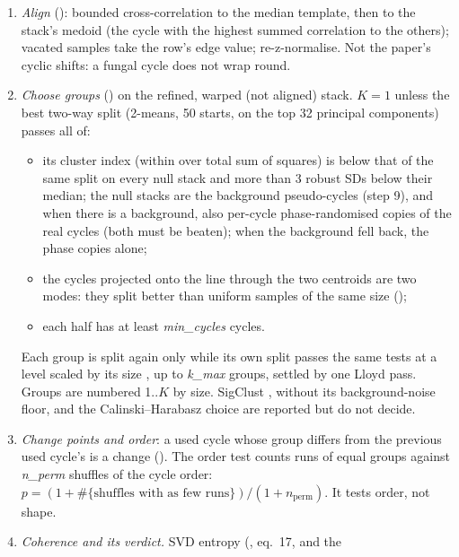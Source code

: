 \begin{enumerate}
  move the anchors by that shift (never more than that fraction from the detector's
  anchor), re-cut and re-warp. A round is kept only while the SVD entropy (eq.~17 of the
  paper) falls by more than its own bootstrap SD over 5 resamples; at most \emph{max\_iter}
  rounds.
\item \emph{Align} (): bounded cross-correlation to the median template,
  then to the stack's medoid (the cycle with the highest summed correlation to the others);
  vacated samples take the row's edge value; re-z-normalise. Not the paper's cyclic shifts:
  a fungal cycle does not wrap round.
\item \emph{Choose groups} () on the refined, warped (not aligned) stack.
  $K = 1$ unless the best two-way split (2-means, 50 starts, on the top 32 principal
  components) passes all of:
  \begin{itemize}
  \item its cluster index (within over total sum of squares) is below that of the same split
    on every null stack and more than 3 robust SDs below their median; the null stacks are
    the background pseudo-cycles (step 9), and when there is a background, also per-cycle
    phase-randomised copies of the real cycles (both must be beaten); when the background
    fell back, the phase copies alone;
  \item the cycles projected onto the line through the two centroids are two modes: they
    split better than uniform samples of the same size ();
  \item each half has at least \emph{min\_cycles} cycles.
  \end{itemize}
  Each group is split again only while its own split passes the same tests at a level
  scaled by its size \citep{kimes2017statistical}, up to \emph{k\_max} groups, settled by one
  Lloyd pass. Groups are numbered 1..$K$ by size. SigClust \citep{liu2008statistical},
  without its background-noise floor, and the Calinski--Harabasz choice are reported but do
  not decide.
\item \emph{Change points and order}: a used cycle whose group differs from the previous used
  cycle's is a change (). The order test counts runs of equal groups
  against \emph{n\_perm} shuffles of the cycle order: $p = (1 + \#\{\text{shuffles with as few
  runs}\})/(1 + n_{\text{perm}})$. It tests order, not shape.
\item \emph{Coherence and its verdict.} SVD entropy (, eq.~17, and the

\end{enumerate}
